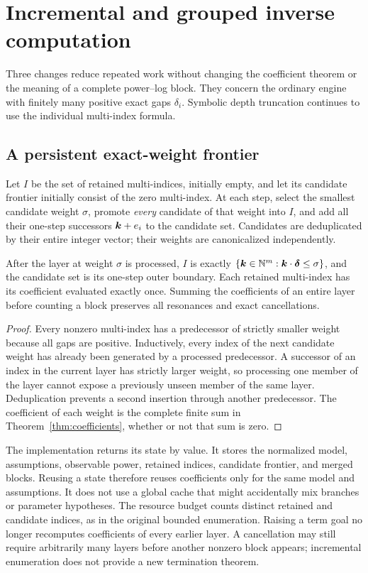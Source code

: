 \section{Incremental and grouped inverse computation}
\label{sec:incremental}

Three changes reduce repeated work without changing the coefficient theorem or
the meaning of a complete power--log block. They concern the ordinary engine
with finitely many positive exact gaps $\delta_i$. Symbolic depth truncation
continues to use the individual multi-index formula.

\subsection{A persistent exact-weight frontier}

Let $I$ be the set of retained multi-indices, initially empty, and let its
candidate frontier initially consist of the zero multi-index. At each step,
select the smallest candidate weight $\sigma$, promote \emph{every} candidate
of that weight into $I$, and add all their one-step successors
$\boldsymbol k+e_i$ to the candidate set. Candidates are deduplicated by their entire
integer vector; their weights are canonicalized independently.

\begin{proposition}
After the layer at weight $\sigma$ is processed, $I$ is exactly
$\{\boldsymbol k\in\mathbb N^m:\boldsymbol k\cdot\boldsymbol\delta\le\sigma\}$, and the candidate set is its
one-step outer boundary. Each retained multi-index has its coefficient
evaluated exactly once. Summing the coefficients of an entire layer before
counting a block preserves all resonances and exact cancellations.
\end{proposition}
\begin{proof}
Every nonzero multi-index has a predecessor of strictly smaller weight because
all gaps are positive. Inductively, every index of the next candidate weight
has already been generated by a processed predecessor. A successor of an index
in the current layer has strictly larger weight, so processing one member of
the layer cannot expose a previously unseen member of the same layer.
Deduplication prevents a second insertion through another predecessor. The
coefficient of each weight is the complete finite sum in
Theorem~\ref{thm:coefficients}, whether or not that sum is zero.
\end{proof}

The implementation returns its state by value. It stores the normalized model,
assumptions, observable power, retained indices, candidate frontier, and merged
blocks. Reusing a state therefore reuses coefficients only for the same model
and assumptions. It does not use a global cache that might accidentally mix
branches or parameter hypotheses. The resource budget counts distinct retained
and candidate indices, as in the original bounded enumeration. Raising a term
goal no longer recomputes coefficients of every earlier layer. A cancellation
may still require arbitrarily many layers before another nonzero block appears;
incremental enumeration does not provide a new termination theorem.

